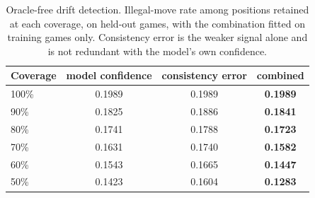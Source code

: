 \begin{table}[t]
\centering\small
\caption{Oracle-free drift detection. Illegal-move rate among
positions retained at each coverage, on held-out games, with the
combination fitted on training games only. Consistency error is the
weaker signal alone and is not redundant with the model's own
confidence.}
\label{tab:detect}
\begin{tabular}{lccc}
\toprule
Coverage & model confidence & consistency error & combined \\
\midrule
100\% & 0.1989 & 0.1989 & \textbf{0.1989} \\
90\% & 0.1825 & 0.1886 & \textbf{0.1841} \\
80\% & 0.1741 & 0.1788 & \textbf{0.1723} \\
70\% & 0.1631 & 0.1740 & \textbf{0.1582} \\
60\% & 0.1543 & 0.1665 & \textbf{0.1447} \\
50\% & 0.1423 & 0.1604 & \textbf{0.1283} \\
\bottomrule
\end{tabular}
\end{table}

